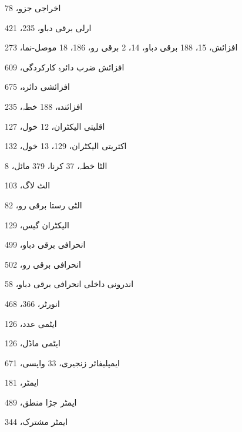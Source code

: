 \begin{theindex}
\item اخراجی جزو، 78
\item ارلی برقی دباو، 235، 421
\item افزائش، 15، 188 
     \subitem برقی دباو، 14، 2 
     \subitem برقی رو، 186، 18 
     \subitem موصل-نما، 273
\item افزائش ضرب دائرہ کارکردگی، 609
\item افزائشی دائرہ، 675
\item افزائندہ، 188 
     \subitem خطہ، 235
\item اقلیتی 
     \subitem الیکٹران، 12 
     \subitem خول، 127
\item اکثریتی 
     \subitem الیکٹران، 129، 13 
     \subitem خول، 132
\item الٹا 
     \subitem خطہ، 37 
     \subitem کرنا، 379 
     \subitem مائل، 8
\item الٹ لاگ، 103
\item الٹی رستا برقی رو، 82
\item الیکٹران گیس، 129
\item انحرافی برقی دباو، 499
\item انحرافی برقی رو، 502
\item اندرونی داخلی انحرافی برقی دباو، 58
\item انورٹر، 366، 468
\item ایٹمی عدد، 126
\item ایٹمی ماڈل، 126
\item ایمپلیفائر 
     \subitem زنجیری، 33 
     \subitem واپسی، 671
\item ایمٹر، 181
\item ایمٹر جڑا منطق، 489
\item ایمٹر مشترک، 344

\indexspace


\end{theindex}
